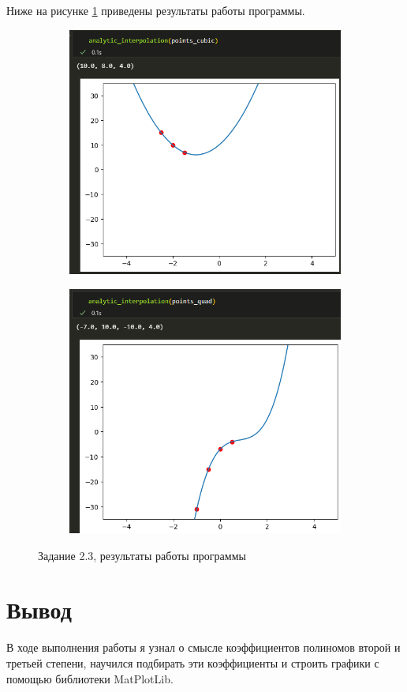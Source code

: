 \documentclass[14pt,a4paper]{extarticle}
\begin{document}
        Ниже на рисунке \ref{fig:2.3-results} приведены результаты работы программы.

\begin{figure}[h!]
    \begin{subfigure}{.5\textwidth}
        \centering
        \includegraphics[width=0.9\linewidth]{figures//inftech//prac2/2.3-res1.png}
    \end{subfigure}%
    \begin{subfigure}{.5\textwidth}
        \centering
        \includegraphics[width=0.9\linewidth]{figures//inftech//prac2/2.3-res2.png}
    \end{subfigure}

    \caption{Задание 2.3, результаты работы программы}
    \label{fig:2.3-results}
\end{figure}

\section*{Вывод}

        В ходе выполнения работы я узнал о смысле коэффициентов полиномов
второй и третьей степени, научился подбирать эти коэффициенты и строить
графики с помощью библиотеки MatPlotLib.
\end{document}
